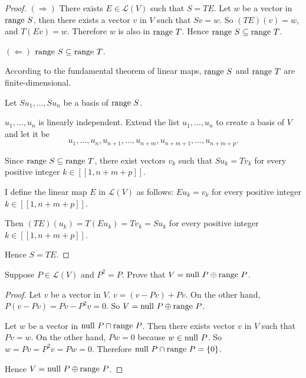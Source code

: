 \begin{proof}
    $(\Rightarrow)$ There exists $E \in \mathcal{L}(V)$ such that $S = TE$. Let $w$ be a vector in $\operatorname{range}\,{S}$, then there exists a vector $v$ in $V$ such that $Sv = w$. So $(TE)(v) = w$, and $T(Ev) = w$. Therefore $w$ is also in $\operatorname{range}\,{T}$. Hence $\operatorname{range}\,{S}\subseteq\operatorname{range}\,{T}$.

    $(\Leftarrow)$ $\operatorname{range}\,{S} \subseteq \operatorname{range}\,{T}$.

    According to the fundamental theorem of linear maps, $\operatorname{range}\,{S}$ and $\operatorname{range}\,{T}$ are finite-dimensional.

    Let $Su_{1}, \ldots, Su_{n}$ be a basis of $\operatorname{range}\,{S}$.

    $u_{1}, \ldots, u_{n}$ is linearly independent. Extend the list $u_{1}, \ldots, u_{n}$ to create a basis of $V$ and let it be
    \[
        u_{1}, \ldots, u_{n}, u_{n+1}, \ldots, u_{n+m}, u_{n+m+1}, \ldots, u_{n+m+p}.
    \]

    Since $\operatorname{range}\,{S}\subseteq \operatorname{range}\,{T}$, there exist vectors $v_{k}$ such that $Su_{k} = Tv_{k}$ for every positive integer $k\in [\![ 1, n+m+p ]\!]$.

    I define the linear map $E$ in $\mathcal{L}(V)$ as follows: $Eu_{k} = v_{k}$ for every positive integer $k\in [\![ 1, n+m+p ]\!]$.

    Then $(TE)(u_{k}) = T(Eu_{k}) = Tv_{k} = Su_{k}$ for every positive integer $k\in [\![ 1, n+m+p ]\!]$.

    Hence $S = TE$.\qedhere
\end{proof}
\newpage

\begin{exercise}\label{chapter3:sectionB:exercise27}
    Suppose $P \in \mathcal{L}(V)$ and $P^{2} = P$. Prove that $V = \operatorname{null}\,{P}\oplus \operatorname{range}\,{P}$.
\end{exercise}

\begin{proof}
    Let $v$ be a vector in $V$. $v = (v - Pv) + Pv$. On the other hand, $P(v - Pv) = Pv - P^{2}v = 0$. So $V = \operatorname{null}\,{P}\oplus \operatorname{range}\,{P}$.

    Let $w$ be a vector in $\operatorname{null}\,{P}\cap\operatorname{range}\,{P}$. Then there exists vector $v$ in $V$ such that $Pv = w$. On the other hand, $Pw = 0$ because $w\in\operatorname{null}\,{P}$. So $w = Pv = P^{2}v = Pw = 0$. Therefore $\operatorname{null}\,{P}\cap\operatorname{range}\,{P} = \{0\}$.

    Hence $V = \operatorname{null}\,{P}\oplus\operatorname{range}\,{P}$.
\end{proof}
\newpage

